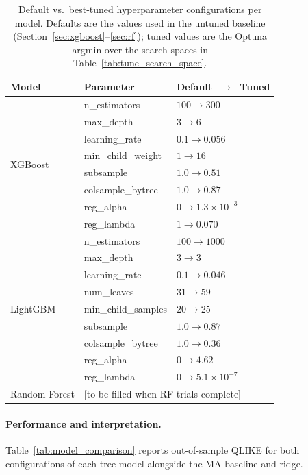 \begin{table}[H]
\centering
\caption{Default vs.\ best-tuned hyperparameter configurations per model. Defaults are the values used in the untuned baseline (Section~\ref{sec:xgboost}--\ref{sec:rf}); tuned values are the Optuna argmin over the search spaces in Table~\ref{tab:tune_search_space}.}
\label{tab:best_tuned_params}
\begin{tabular}{lll}
\toprule
Model & Parameter & Default $\;\to\;$ Tuned \\
\midrule
\multirow{8}{*}{XGBoost}
 & n\_estimators     & $100 \to 300$ \\
 & max\_depth        & $3 \to 6$ \\
 & learning\_rate    & $0.1 \to 0.056$ \\
 & min\_child\_weight & $1 \to 16$ \\
 & subsample         & $1.0 \to 0.51$ \\
 & colsample\_bytree & $1.0 \to 0.87$ \\
 & reg\_alpha        & $0 \to 1.3\!\times\!10^{-3}$ \\
 & reg\_lambda       & $1 \to 0.070$ \\
\midrule
\multirow{9}{*}{LightGBM}
 & n\_estimators      & $100 \to 1000$ \\
 & max\_depth         & $3 \to 3$ \\
 & learning\_rate     & $0.1 \to 0.046$ \\
 & num\_leaves        & $31 \to 59$ \\
 & min\_child\_samples & $20 \to 25$ \\
 & subsample          & $1.0 \to 0.87$ \\
 & colsample\_bytree  & $1.0 \to 0.36$ \\
 & reg\_alpha         & $0 \to 4.62$ \\
 & reg\_lambda        & $0 \to 5.1\!\times\!10^{-7}$ \\
\midrule
Random Forest & \multicolumn{2}{l}{[to be filled when RF trials complete]} \\
\bottomrule
\end{tabular}
\end{table}

\paragraph{Performance and interpretation.}
Table~\ref{tab:model_comparison} reports out-of-sample QLIKE for both configurations of each tree model alongside the MA baseline and ridge.

